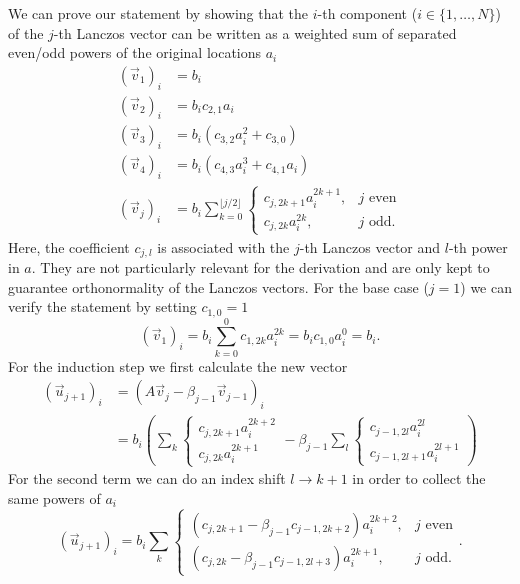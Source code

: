 We can prove our statement by showing that the $i$-th component ($i \in \{1, \ldots, N\}$)
of the $j$-th Lanczos vector
can be written as a weighted sum
of separated even/odd powers of the original locations $a_i$
\begin{align}
    (\vec{v}_1)_i
     & = b_i                              \\
    (\vec{v}_2)_i
     & = b_i c_{2,1} a_i                  \\
    (\vec{v}_3)_i
     & = b_i ( c_{3,2}a_i^2 + c_{3,0})    \\
    (\vec{v}_4)_i
     & = b_i ( c_{4,3}a_i^3 + c_{4,1}a_i) \\
    (\vec{v}_j)_i
     & =
    b_i\sum\limits_{k=0}^{\lfloor j/2\rfloor}
    \begin{cases}
        c_{j,2k+1} a_i^{2k+1}, & j \text{ even} \\
        c_{j,2k} a_i^{2k},     & j \text{ odd}.
    \end{cases}
    \label{eq:statement-tridiagonalization}
\end{align}
Here, the coefficient $c_{j,l}$ is associated with the $j$-th Lanczos vector
and $l$-th power in $a$.
They are not particularly relevant for the derivation and are only kept to guarantee
orthonormality of the Lanczos vectors.
For the base case ($j=1$) we can verify the statement by setting $c_{1,0}=1$
\begin{equation}
    (\vec{v}_1)_i
    =
    b_i\!\sum\limits_{k=0}^{0} c_{1,2k} a_i^{2k}
    =
    b_i c_{1,0} a_i^0
    =
    b_i.
\end{equation}
For the induction step we first calculate the new vector
\begin{align}
    (\vec{u}_{j+1})_i
     & =
    (A \vec{v}_j - \beta_{j-1}\vec{v}_{j-1})_i \\
     & =
    b_i
    \left(
    \sum\limits_k
    \begin{cases}
        c_{j,2k+1} a_i^{2k+2} \\
        c_{j,2k} a_i^{2k+1}
    \end{cases}
    - \beta_{j-1}
    \sum\limits_l
    \begin{cases}
        c_{j-1,2l} a_i^{2l} \\
        c_{j-1,2l+1} a_i^{2l+1}
    \end{cases}
    \right)
\end{align}
For the second term we can do an index shift $l \rightarrow k+1$
in order to collect the same powers of $a_i$
\begin{equation}
    (\vec{u}_{j+1})_i
    =
    b_i
    \sum\limits_k
    \begin{cases}
        (c_{j,2k+1} - \beta_{j-1} c_{j-1,2k+2}) a_i^{2k+2}, & j \text{ even} \\
        (c_{j,2k} - \beta_{j-1} c_{j-1,2l+3}) a_i^{2k+1},   & j \text{ odd}.
    \end{cases}.
\end{equation}
